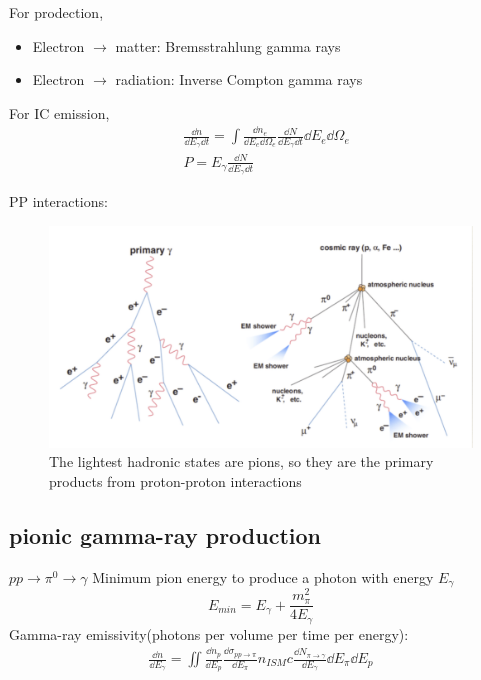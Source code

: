 \documentclass{sciposter}
\begin{document}
\begin{multicols}{3}
For prodection,
\begin{itemize}
    \item Electron $\rightarrow$ matter: Bremsstrahlung gamma rays
    \item Electron $\rightarrow$ radiation: Inverse Compton gamma rays
\end{itemize}

For IC emission,
\begin{align}
    &\frac{\dd{n}}{\dd{E_{\gamma} }\dd{t}}=\int \frac{\dd{n_{e} }}{\dd{E_{e} \dd{\Omega_{e} }}
    }\frac{\dd{N}}{\dd{E_{\gamma} }\dd{t}}\dd{E_{e} }\dd{\Omega_{e} }\\
    &P=E_{\gamma}\frac{\dd{N}}{\dd{E_{\gamma} }\dd{t}} 
\end{align}

PP interactions:

\begin{figure}
    \centering 
    \includegraphics[width=1\textwidth]{1.png}
    \caption{The lightest hadronic states are pions, so they are the primary products from proton-proton interactions}
\end{figure}

\subsection{pionic gamma-ray production}
$pp\rightarrow \pi^{0}\rightarrow \gamma $
Minimum pion energy to produce a photon with energy $E_{\gamma} $ $$E_{min}=E_{\gamma} +\frac{m_{\pi}^{2}  }{4E_{\gamma} }$$ 
Gamma-ray emissivity(photons per volume per time per energy):
\begin{align}
    \frac{\dd{n}}{\dd{E_{\gamma} }}=\iint \frac{\dd{n_{p} }}{\dd{E_{p} }}\frac{\dd{\sigma_{pp \rightarrow \pi} }}{\dd{E_{\pi} }}n_{ISM}c\frac{\dd{N_{\pi \rightarrow \gamma} }}{\dd{E_{\gamma} }}\dd{E_{\pi} }\dd{E_{p} } 
 \end{align}




\end{multicols}
\end{document}
